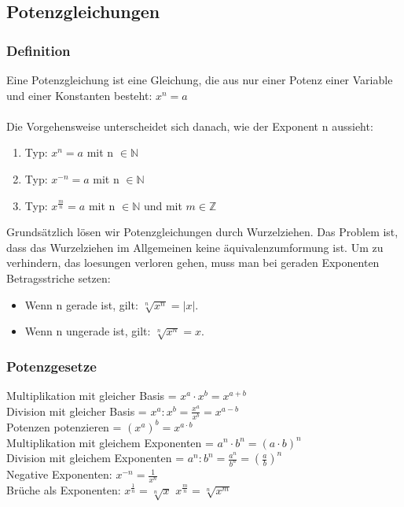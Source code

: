 \begin{multicols}{2}
    \subsection{Potenzgleichungen}
    \vspace{-4mm}
    \subsubsection{Definition}
    \vspace{-4mm}
    Eine Potenzgleichung ist eine Gleichung, die aus nur einer Potenz einer Variable und einer Konstanten besteht: $x^n = a$ \\~\\
    Die Vorgehensweise unterscheidet sich danach, wie der Exponent n aussieht:
    \begin{enumerate}
        \item Typ: $x^n = a$ mit n $\in \mathbb{N}$
        \item Typ: $x^{-n} = a$ mit n $\in \mathbb{N}$
        \item Typ: $x^{\frac{m}{n}} = a$ mit n $\in \mathbb{N}$ und mit $m \in \mathbb{Z}$
    \end{enumerate}
    Grundsätzlich lösen wir Potenzgleichungen durch Wurzelziehen. Das Problem ist, dass das Wurzelziehen im Allgemeinen keine äquivalenzumformung ist. Um zu verhindern, das loesungen verloren gehen, muss man bei geraden Exponenten Betragsstriche setzen:
    \begin{itemize}
        \item Wenn n gerade ist, gilt: $\sqrt[n]{x^n} = |x|$.
        \item Wenn n ungerade ist, gilt: $\sqrt[n]{x^n} = x$.
    \end{itemize}
    \subsubsection{Potenzgesetze}
    \vspace{-4mm}
    Multiplikation mit gleicher Basis = $x^a \cdot x^b = x^{a+b}$ \\
    Division mit gleicher Basis = $x^a : x^b = \frac{x^a}{x^b} = x^{a-b}$ \\
    Potenzen potenzieren = $\left(x^a\right)^b = x^{a \cdot b}$ \\
    Multiplikation mit gleichem Exponenten = $a^n \cdot b^n = \left(a \cdot b\right)^n$ \\
    Division mit gleichem Exponenten = $a^n : b^n = \frac{a^n}{b^n} = \left(\frac{a}{b}\right)^n$ \\
    Negative Exponenten: $x^{-n} = \frac{1}{x^n}$ \\
    Brüche als Exponenten: $x^{\frac{1}{n}} = \sqrt[n]{x}$ $x^{\frac{m}{n}} = \sqrt[n]{x^m}$ \\


\end{multicols}
